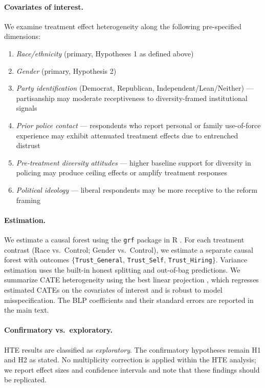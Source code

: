 \paragraph{Covariates of interest.}
We examine treatment effect heterogeneity along the following pre-specified dimensions:
\begin{enumerate}
    \item \textit{Race/ethnicity} (primary, Hypotheses 1 as defined above)
    \item \textit{Gender} (primary, Hypothesis 2)
    \item \textit{Party identification} (Democrat, Republican, Independent/Lean/Neither) --- partisanship may moderate receptiveness to diversity-framed institutional signals
    \item \textit{Prior police contact} --- respondents who report personal or family use-of-force experience may exhibit attenuated treatment effects due to entrenched distrust
    \item \textit{Pre-treatment diversity attitudes} --- higher baseline support for diversity in policing may produce ceiling effects or amplify treatment responses
    \item \textit{Political ideology} --- liberal respondents may be more receptive to the reform framing
\end{enumerate}

\paragraph{Estimation.}
We estimate a causal forest using the \texttt{grf} package in R \citep{tibshirani2022grf}.
For each treatment contrast (Race vs.\ Control; Gender vs.\ Control), we estimate a separate causal forest with outcomes $\{$\texttt{Trust\_General}, \texttt{Trust\_Self}, \texttt{Trust\_Hiring}$\}$.
Variance estimation uses the built-in honest splitting and out-of-bag predictions.
We summarize CATE heterogeneity using the best linear projection \citep[BLP;][]{Semenova2021}, which regresses estimated CATEs on the covariates of interest and is robust to model misspecification.
The BLP coefficients and their standard errors are reported in the main text.

\paragraph{Confirmatory vs.\ exploratory.}
HTE results are classified as \textit{exploratory}. The confirmatory hypotheses remain H1 and H2 as stated.
No multiplicity correction is applied within the HTE analysis; we report effect sizes and confidence intervals and note that these findings should be replicated.

